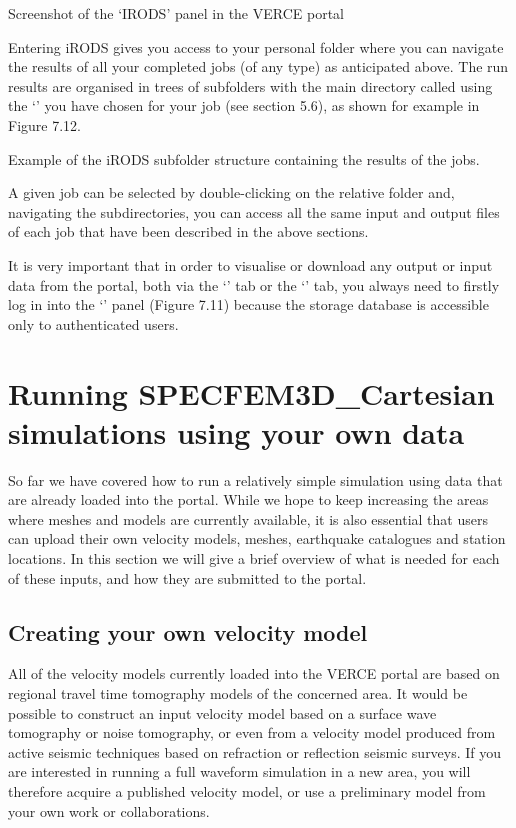 \documentclass[english]{book}
\begin{document}
 Screenshot of the ‘IRODS’ panel in the VERCE portal

Entering iRODS gives you access to your personal folder where you can
navigate the results of all your completed jobs (of any type) as
anticipated above. The run results are organised in trees of subfolders
with the main directory called using the ‘’ you have chosen
for your job (see section 5.6), as shown for example in Figure 7.12.


 Example of the iRODS subfolder structure containing
the results of the jobs.

A given job can be selected by double-clicking on the relative folder
and, navigating the subdirectories, you can access all the same input
and output files of each job that have been described in the above
sections.

It is very important that in order to visualise or download any output
or input data from the portal, both via the ‘’ tab or the
‘’ tab, you always need to firstly log in into the
‘’ panel (Figure 7.11) because the storage database is
accessible only to authenticated users.


\chapter{Running SPECFEM3D\_Cartesian simulations using your own data}
\label{\detokenize{Section8:running-specfem3d-cartesian-simulations-using-your-own-data}}\label{\detokenize{Section8::doc}}
So far we have covered how to run a relatively simple simulation using
data that are already loaded into the portal. While we hope to keep
increasing the areas where meshes and models are currently available, it
is also essential that users can upload their own velocity models,
meshes, earthquake catalogues and station locations. In this section we
will give a brief overview of what is needed for each of these inputs,
and how they are submitted to the portal.


\section{Creating your own velocity model}
\label{\detokenize{Section8:creating-your-own-velocity-model}}
All of the velocity models currently loaded into the VERCE portal are
based on regional travel time tomography models of the concerned area.
It would be possible to construct an input velocity model based on a
surface wave tomography or noise tomography, or even from a velocity
model produced from active seismic techniques based on refraction or
reflection seismic surveys. If you are interested in running a full
waveform simulation in a new area, you will therefore acquire a
published velocity model, or use a preliminary model from your own work
or collaborations.
\end{document}

